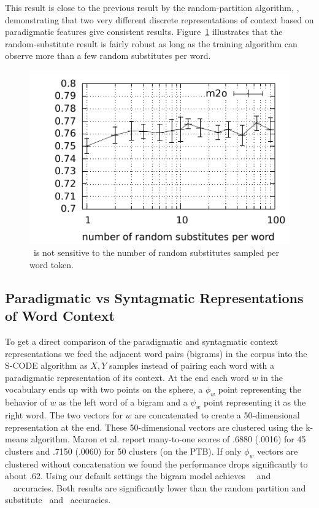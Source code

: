 This result is close to the previous result by the random-partition
algorithm, \rpmto, demonstrating that two very different discrete
representations of context based on paradigmatic features give
consistent results.  Figure~\ref{plot-s} illustrates that the
random-substitute result is fairly robust as long as the training
algorithm can observe more than a few random substitutes per word.

\begin{figure}[ht] \centering
\includegraphics[width=0.5\linewidth]{plot-s.pdf}
\caption{\mto\ is not sensitive to the number of random substitutes
  sampled per word token.}
\label{plot-s}
\end{figure}

\subsection{Paradigmatic vs Syntagmatic Representations of Word Context}\label{sec:bigram}

To get a direct comparison of the paradigmatic and syntagmatic context
representations we feed the adjacent word pairs (bigrams) in the
corpus into the S-CODE algorithm as $X, Y$ samples
\cite{maron2010sphere} instead of pairing each word with a
paradigmatic representation of its context.  At the end each word $w$
in the vocabulary ends up with two points on the sphere, a $\phi_w$
point representing the behavior of $w$ as the left word of a bigram
and a $\psi_w$ point representing it as the right word.  The two
vectors for $w$ are concatenated to create a 50-dimensional
representation at the end.  These 50-dimensional vectors are clustered
using the k-means algorithm.  Maron et al. 
report many-to-one scores of .6880 (.0016) for 45 clusters and .7150
(.0060) for 50 clusters (on the PTB).  If only $\phi_w$ vectors are
clustered without concatenation we found the performance drops
significantly to about .62.  Using our default settings the bigram
model achieves \bgmto\ \mto\ and \bgvm\ \vm\ accuracies.  Both results are
significantly lower than the random partition and substitute \mto\ and
\vm\ accuracies.
